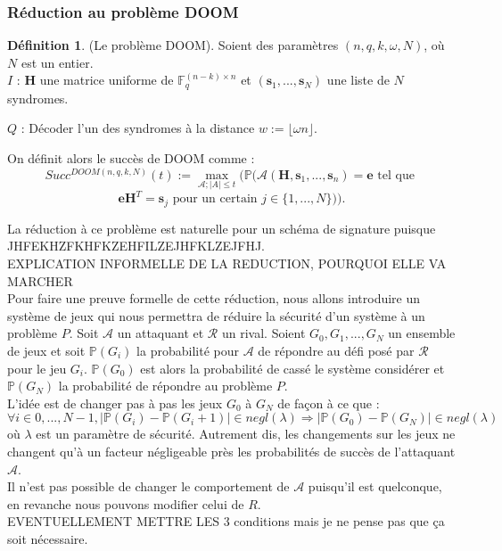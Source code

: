 \documentclass[12pt]{article}
\theoremstyle{definition}
\newtheorem{defi}[thm]{Définition}
\newcommand{\F}{\mathbb{F}}
\begin{document}
\subsubsection{Réduction au problème DOOM}
\begin{defi} (Le problème DOOM). Soient des paramètres $(n,q,k,\omega,N)$, où $N$ est un entier. \\

\leftskip=1cm
\noindent$I$ : $\mathbf{H}$ une matrice uniforme de $\F_q^{(n-k)\times n}$ et $(\mathbf{s}_1,...,\mathbf{s}_N)$ une liste de $N$ syndromes. 

\noindent$Q$ : Décoder l'un des syndromes à la distance $w := \lfloor \omega n \rfloor$. 

\leftskip=0cm

On définit alors le succès de DOOM comme :
$$Succ^{DOOM(n,q,k,N)}(t) := \max_{\mathcal{A};|A|\leq t}(\mathbb{P}(\mathcal{A}(\mathbf{H},\mathbf{s}_1,...,\mathbf{s}_n)=\mathbf{e}\text{ tel que }$$
$$ \mathbf{eH}^T = \mathbf{s}_j \text{ pour un certain } j \in \{1,...,N\})).$$
\end{defi} 

La réduction à ce problème est naturelle pour un schéma de signature puisque JHFEKHZFKHFKZEHFILZEJHFKLZEJFHJ. \\ 
EXPLICATION INFORMELLE DE LA REDUCTION, POURQUOI ELLE VA MARCHER \\

Pour faire une preuve formelle de cette réduction, nous allons introduire un système de jeux qui nous permettra de réduire la sécurité d'un système à un problème $P$. Soit $\mathcal{A}$ un attaquant et $\mathcal{R}$ un rival. Soient $G_0, G_1, ...,G_N$ un ensemble de jeux et soit $\mathbb{P}(G_i)$ la probabilité pour $\mathcal{A}$ de répondre au défi posé par $\mathcal{R}$ pour le jeu $G_i$. $\mathbb{P}(G_0)$ est alors la probabilité de cassé le système considérer et $\mathbb{P}(G_N)$ la probabilité de répondre au problème $P$. \\
L'idée est de changer pas à pas les jeux $G_0$ à $G_N$ de façon à ce que :
$$\forall i \in {0,...,N-1}, |\mathbb{P}(G_i)-\mathbb{P}(G_i+1)| \in negl(\lambda) \Longrightarrow |\mathbb{P}(G_0)-\mathbb{P}(G_N)|  \in negl(\lambda)$$
où $\lambda$ est un paramètre de sécurité. Autrement dis, les changements sur les jeux ne changent qu'à un facteur négligeable près les probabilités de succès de l'attaquant $\mathcal{A}$. \\
Il n'est pas possible de changer le comportement de $\mathcal{A}$ puisqu'il est quelconque, en revanche nous pouvons modifier celui de $R$. \\
EVENTUELLEMENT METTRE LES 3 conditions mais je ne pense pas que ça soit nécessaire. \\
\end{document}
